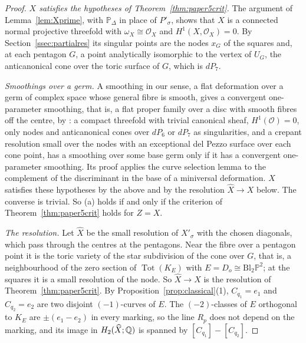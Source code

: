 \begin{proof}
\emph{$X$ satisfies the hypotheses of Theorem~\ref{thm:paper5crit}.} The argument of Lemma~\ref{lem:Xprime}, with $\mathbb
P_\Delta$ in place of $P'_\sigma$, shows that $X$ is a connected normal projective threefold with $\omega_X\cong\mathcal O_X$ and
$H^1(X,\mathcal O_X)=0$. By Section~\ref{ssec:partialres} its singular points are the nodes $x_G$ of the squares and, at each
pentagon $G$, a point analytically isomorphic to the vertex of $U_G$, the anticanonical cone over the toric surface of $G$,
which is $dP_7$.

\emph{Smoothings over a germ.} A smoothing in our sense, a flat deformation over a germ of complex space whose general
fibre is smooth, gives a convergent one-parameter smoothing, that is, a flat proper family over a disc with smooth fibres
off the centre, by \cite[Cor.~6.7]{Paper4}: a compact threefold with trivial canonical sheaf, $H^1(\mathcal O)=0$, only nodes
and anticanonical cones over $dP_6$ or $dP_7$ as singularities, and a crepant resolution small over the nodes with an
exceptional del Pezzo surface over each cone point, has a smoothing over some base germ only if it has a convergent
one-parameter smoothing. Its proof applies the curve selection lemma to the complement of the discriminant in the base of
a miniversal deformation. $X$ satisfies these hypotheses by the above and by the resolution $\widehat X\to X$ below. The
converse is trivial. So (a) holds if and only if the criterion of Theorem~\ref{thm:paper5crit} holds for $Z=X$.

\emph{The resolution.} Let $\widehat X$ be the small resolution of $X'_\sigma$ with the chosen diagonals, which pass
through the centres at the pentagons. Near the fibre over a pentagon point it is the toric variety of the star subdivision
of the cone over $G$, that is, a neighbourhood of the zero section of $\operatorname{Tot}(K_E)$ with
$E=D_o\cong\mathrm{Bl}_2\mathbb P^2$; at the squares it is a small resolution of the node. So $\widehat X\to X$ is the resolution
of Theorem~\ref{thm:paper5crit}. By Proposition~\ref{prop:classical}(1), $C_{q_1}=e_1$ and $C_{q_2}=e_2$ are two disjoint
$(-1)$-curves of $E$. The $(-2)$-classes of $E$ orthogonal to $K_E$ are $\pm(e_1-e_2)$ in every marking, so the line $R_p$
does not depend on the marking, and its image in $H_2(\widehat X;\mathbb Q)$ is spanned by $[C_{q_1}]-[C_{q_2}]$.


\end{proof}
